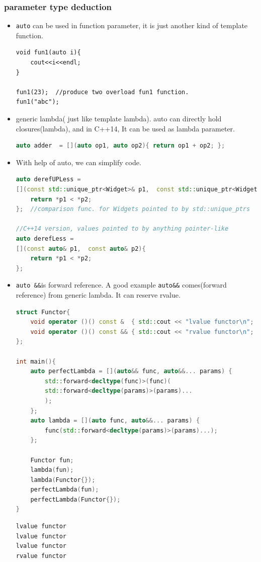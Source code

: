 \documentclass[a4paper,11pt,twoside]{book}
\begin{document}
\subsubsection{parameter type deduction}
\begin{itemize}
	\item \texttt{auto} can be used in function parameter, it is just another kind of template function.

\begin{lstlisting}[numbers=none]
void fun1(auto i){
    cout<<i<<endl;
}
		
fun1(23);  //produce two overload fun1 function.
fun1("abc");
\end{lstlisting}
    \item generic lambda( just like template lambda). auto can directly hold closures(lambda), and in C++14, It can be used as lambda parameter.
\begin{lstlisting}[frame=single, language=c++]
auto adder  = [](auto op1, auto op2){ return op1 + op2; };
\end{lstlisting}
	
	\item With help of auto, we can simplify code. 
\begin{lstlisting}[frame=single, language=c++]
auto derefUPLess =               
[](const std::unique_ptr<Widget>& p1,  const std::unique_ptr<Widget>& p2){
	return *p1 < *p2; 
};  //comparison func. for Widgets pointed to by std::unique_ptrs               

//C++14 version, values pointed to by anything pointer-like
auto derefLess = 
[](const auto& p1,  const auto& p2){
	return *p1 < *p2; 
}; 
\end{lstlisting}
	

	\item \texttt{auto \&\&}is forward reference. A good example \texttt{auto\&\&} comes(forward reference) from generic lambda. It can reserve rvalue.
\begin{lstlisting}[frame=single, language=c++]
struct Functor{
    void operator ()() const &  { std::cout << "lvalue functor\n"; }
    void operator ()() const && { std::cout << "rvalue functor\n"; }
};

int main(){
    auto perfectLambda = [](auto&& func, auto&&... params) {
        std::forward<decltype(func)>(func)(
        std::forward<decltype(params)>(params)...
        );
    };
    auto lambda = [](auto func, auto&&... params) {
        func(std::forward<decltype(params)>(params)...);
    };
    
    Functor fun;
    lambda(fun);
    lambda(Functor{});
    perfectLambda(fun);
    perfectLambda(Functor{});
}
\end{lstlisting}

\begin{lstlisting}[frame=single, language=c++]
lvalue functor
lvalue functor
lvalue functor
rvalue functor
\end{lstlisting}
	

\end{itemize}
\end{document}

